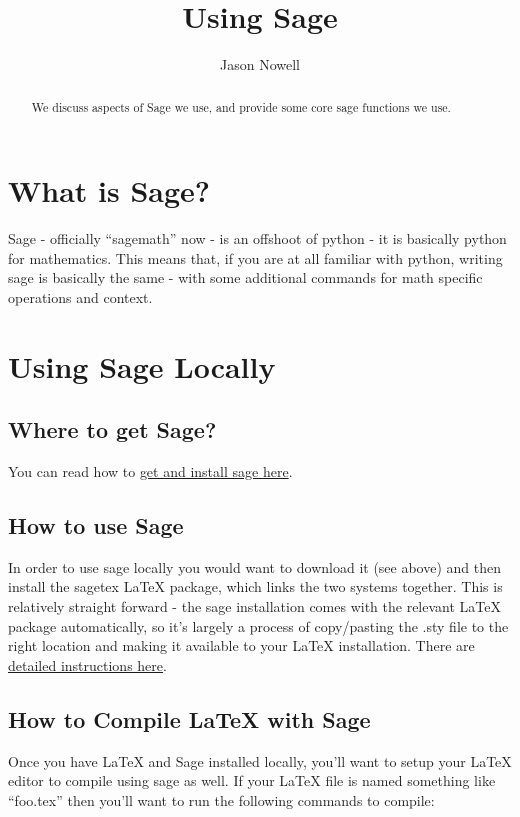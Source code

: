 \documentclass{ximera}
\title{Using Sage}
\author{Jason Nowell}
\begin{document}
\begin{abstract}
    We discuss aspects of Sage we use, and provide some core sage functions we use.
\end{abstract}
\maketitle

\section*{What is Sage?}
    Sage - officially ``sagemath'' now - is an offshoot of python - it is basically python for mathematics. This means that, if you are at all familiar with python, writing sage is basically the same - with some additional commands for math specific operations and context.

\section*{Using Sage Locally}
    \subsection{Where to get Sage?}
        You can read how to \href{https://www.sagemath.org/download.html}{get and install sage here}. 
    
    \subsection{How to use Sage}
        In order to use sage locally you would want to download it (see above) and then install the sagetex LaTeX package, which links the two systems together. This is relatively straight forward - the sage installation comes with the relevant LaTeX package automatically, so it's largely a process of copy/pasting the .sty file to the right location and making it available to your LaTeX installation. There are \href{https://doc.sagemath.org/html/en/reference/misc/sagetex.html}{detailed instructions here}.
    
    \subsection{How to Compile LaTeX with Sage}
        Once you have LaTeX and Sage installed locally, you'll want to setup your LaTeX editor to compile using sage as well. If your LaTeX file is named something like ``foo.tex'' then you'll want to run the following commands to compile:
        
\end{document}
